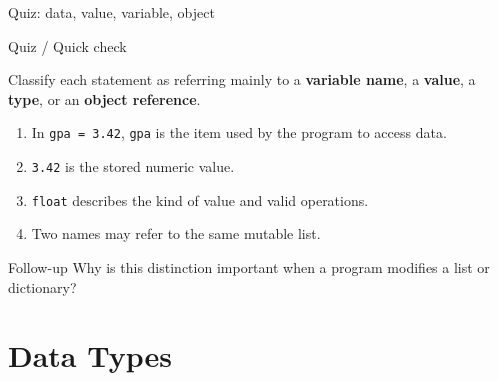 \documentclass[aspectratio=169]{beamer}
\newcommand{\quizblock}[1]{%
  \begin{alertblock}{Quiz / Quick check}
    #1
  \end{alertblock}
}
\begin{document}
\begin{frame}{Quiz: data, value, variable, object}
\small
\quizblock{
Classify each statement as referring mainly to a \textbf{variable name}, a
\textbf{value}, a \textbf{type}, or an \textbf{object reference}.
}
\vspace{0.35em}
\begin{enumerate}
  \item In \texttt{gpa = 3.42}, \texttt{gpa} is the item used by the program to access data.
  \item \texttt{3.42} is the stored numeric value.
  \item \texttt{float} describes the kind of value and valid operations.
  \item Two names may refer to the same mutable list.
\end{enumerate}
\vspace{0.35em}
\begin{alertblock}{Follow-up}
Why is this distinction important when a program modifies a list or dictionary?
\end{alertblock}
\end{frame}

\section{Data Types}
\end{document}

